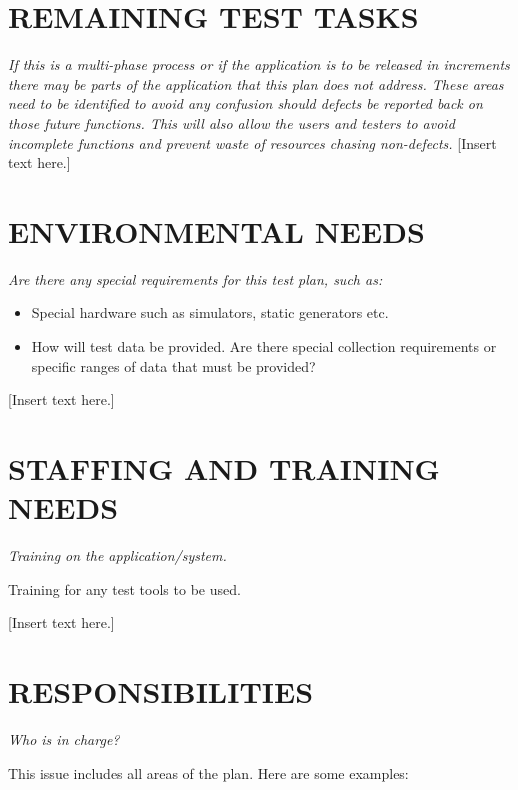 {\section[REMAINING TEST TASKS]{\bfseries\color{black} REMAINING TEST TASKS}
{\itshape\color{black}
If this is a multi-phase process or if the application is to be
released in increments there may be parts of the application that this
plan does not address. These areas need to be identified to avoid any
confusion should defects be reported back on those future
functions. This will also allow the users and testers to avoid
incomplete functions and prevent waste of resources chasing non-defects.
}
{\color{black}
[Insert text here.]}

\section[ENVIRONMENTAL NEEDS]{\bfseries\color{black} ENVIRONMENTAL NEEDS}
{\itshape\color{black}
Are there any special requirements for this test plan, such as:

\begin{itemize}
\item Special hardware such as simulators, static generators etc.
\item How will test data be provided. Are there special collection
	requirements or specific ranges of data that must be provided? 
\end{itemize}

}
{\color{black}
[Insert text here.]}

\section[STAFFING AND TRAINING NEEDS]{\bfseries\color{black}
	 STAFFING AND TRAINING NEEDS}
{\itshape\color{black}
Training on the application/system.

Training for any test tools to be used. 
}
{\color{black}
[Insert text here.]}

\section[RESPONSIBILITIES]{\bfseries\color{black} RESPONSIBILITIES}
{\itshape\color{black}
Who is in charge?

This issue includes all areas of the plan. Here are some examples:

}}
